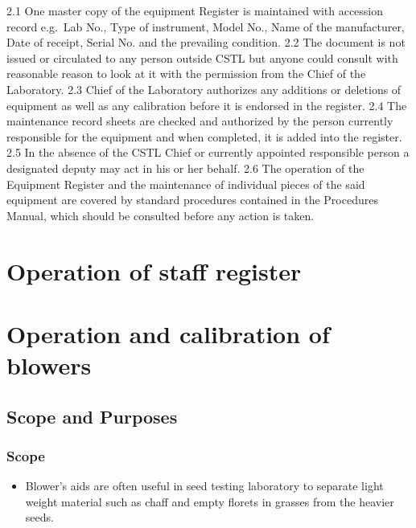 \documentclass[]{book}
\providecommand{\tightlist}{%
  \setlength{\itemsep}{0pt}\setlength{\parskip}{0pt}}
\begin{document}
2.1 One master copy of the equipment Register is maintained with
accession record e.g.~Lab No., Type of instrument, Model No., Name of
the manufacturer, Date of receipt, Serial No. and the prevailing
condition. 2.2 The document is not issued or circulated to any person
outside CSTL but anyone could consult with reasonable reason to look at
it with the permission from the Chief of the Laboratory. 2.3 Chief of
the Laboratory authorizes any additions or deletions of equipment as
well as any calibration before it is endorsed in the register. 2.4 The
maintenance record sheets are checked and authorized by the person
currently responsible for the equipment and when completed, it is added
into the register. 2.5 In the absence of the CSTL Chief or currently
appointed responsible person a designated deputy may act in his or her
behalf. 2.6 The operation of the Equipment Register and the maintenance
of individual pieces of the said equipment are covered by standard
procedures contained in the Procedures Manual, which should be consulted
before any action is taken.



\chapter{Operation of staff register}\label{operation-of-staff-register}

\chapter{Operation and calibration of
blowers}\label{operation-and-calibration-of-blowers}

\section{Scope and Purposes}\label{scope-and-purposes}

\subsection{Scope}\label{scope-1}

\begin{itemize}
\tightlist
\item
  Blower's aids are often useful in seed testing laboratory to separate
  light weight material such as chaff and empty florets in grasses from
  the heavier seeds.
\end{itemize}
\end{document}
